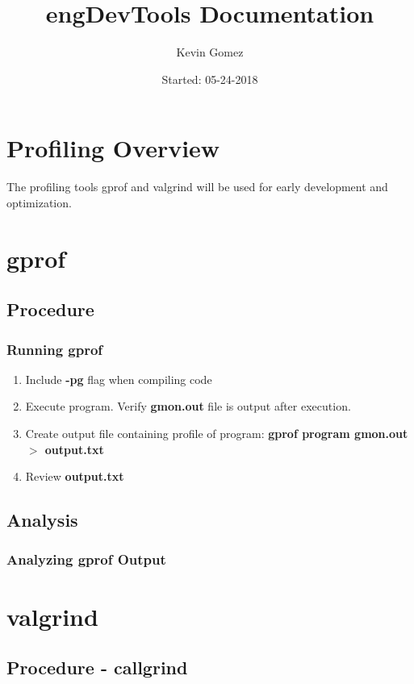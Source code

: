 \documentclass{article}
\title{engDevTools Documentation}
\date{Started: 05-24-2018}
\author{Kevin Gomez}
\begin{document}
	
	\maketitle
	\newpage
	
	\section{Profiling Overview}
	The profiling tools gprof and valgrind will be used for early development and optimization.
	
	\section{gprof}
		\subsection{Procedure}
			\subsubsection{Running gprof}
				\begin{enumerate}
					\item Include \textbf{-pg} flag when compiling code
					\item Execute program. Verify \textbf{gmon.out} file is output after execution.
					\item Create output file containing profile of program: \newline 
					\textbf{gprof program gmon.out $>$ output.txt}
					\item Review \textbf{output.txt}
				\end{enumerate}
		\subsection{Analysis}
			\subsubsection{Analyzing gprof Output}

	\section{valgrind}
		\subsection{Procedure - callgrind}
\end{document}
